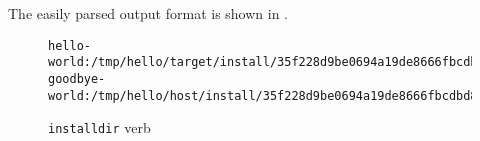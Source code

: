 The easily parsed output format is shown in
.

\begin{figure}[tbh]
\hrulefill
\begin{footnotesize}
\begin{verbatim}
hello-world:/tmp/hello/target/install/35f228d9be0694a19de8666fbcdbd80d
goodbye-world:/tmp/hello/host/install/35f228d9be0694a19de8666fbcdbd80d
\end{verbatim}
\end{footnotesize}
\hrulefill
\caption{\texttt{installdir} verb}\label{usinglmsbw:installdir-verb}
\end{figure}

